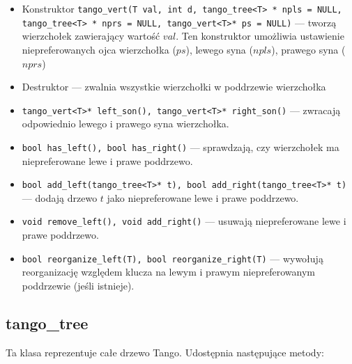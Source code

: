 \documentclass[declaration,shortabstract]{iithesis}
\theoremstyle{thm}
\theoremstyle{remark}
\theoremstyle{plain}
\theoremstyle{plain}
\theoremstyle{plain}
\begin{document}
\begin{itemize}

\item{Konstruktor \texttt{tango\_vert(T val, int d, tango\_tree<T> * npls = NULL, \\tango\_tree<T> * nprs = NULL, tango\_vert<T>* ps = NULL)} --- tworzą \\wierzchołek zawierający wartość $val$. Ten konstruktor umożliwia ustawienie niepreferowanych ojca wierzchołka ($ps$), lewego syna ($npls$), prawego syna ($nprs$)}

\item{Destruktor --- zwalnia wszystkie wierzchołki w poddrzewie wierzchołka}

\item{\texttt{tango\_vert<T>* left\_son(), tango\_vert<T>* right\_son()} --- zwracają odpowiednio lewego i prawego syna wierzchołka. }
    
\item{\texttt{bool has\_left(), bool has\_right()} --- sprawdzają, czy wierzchołek ma niepreferowane lewe i prawe poddrzewo. }

\item{\texttt{bool add\_left(tango\_tree<T>* t), bool add\_right(tango\_tree<T>* t)} --- dodają drzewo $t$ jako niepreferowane lewe i prawe poddrzewo. }

\item{\texttt{void remove\_left(), void add\_right()} --- usuwają niepreferowane lewe i prawe poddrzewo. }

\item{\texttt{bool reorganize\_left(T), bool reorganize\_right(T)} --- wywołują reorganizację względem klucza na lewym i prawym niepreferowanym poddrzewie (jeśli istnieje). }

\end{itemize}

\subsection{tango\_tree}

Ta klasa reprezentuje całe drzewo Tango.  Udostępnia następujące metody: 
\end{document}
